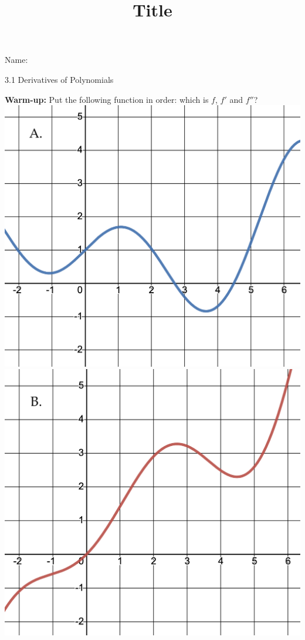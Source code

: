 \documentclass[12pt]{article}
\title{Title}
\begin{document}

 Name:
 \begin{center}\large{3.1 Derivatives of Polynomials}\end{center}

\textbf{Warm-up:} Put the following function in order: which is $f$, $f'$ and $f''$?\\
\includegraphics [scale=.12]{3_1_a}
\includegraphics [scale=.12]{3_1_b}
\end{document}
